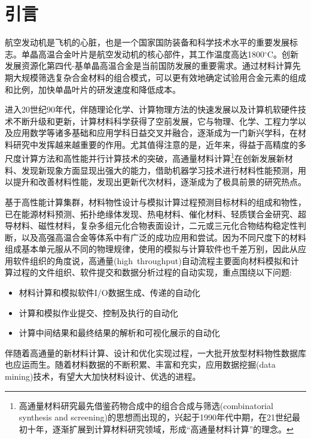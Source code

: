 \section{引言}
航空发动机是飞机的心脏，也是一个国家国防装备和科学技术水平的重要发展标志。单晶高温合金叶片是航空发动机的核心部件，其工作温度高达1800$^{\circ}\mathrm{C}$。创新发展资源化第四代-基单晶高温合金是当前国防发展的重要需求。通过材料计算先期大规模筛选复杂合金材料的组合模式，可以更有效地确定试验用合金元素的组成和比例，加快单晶叶片的研发速度和降低成本。

进入20世纪90年代，伴随理论化学、计算物理方法的快速发展以及计算机软硬件技术不断升级和更新，计算材料科学获得了空前发展，它与物理、化学、工程力学以及应用数学等诸多基础和应用学科日益交叉并融合，逐渐成为一门新兴学科，在材料研究中发挥越来越重要的作用。尤其值得注意的是，近年来，得益于高精度的多尺度计算方法和高性能并行计算技术的突破，高通量材料计算\footnote{高通量材料研究最先借鉴药物合成中的组合合成与筛选\textrm{(combinatorial synthesis and screening)}的思想而出现的，兴起于1990年代中期，在21世纪最初十年，逐渐扩展到计算材料研究领域，形成“高通量材料计算”的理念。}在创新发展新材料、发现新现象方面显现出强大的能力，借助机器学习技术进行材料性能预测，用以提升和改善材料性能，发现出更新代次材料，逐渐成为了极具前景的研究热点。

基于高性能计算集群，材料物性设计与模拟计算过程预测目标材料的组成和物性， 已在能源材料预测、拓扑绝缘体发现、热电材料、催化材料、轻质镁合金研究、超导材料、磁性材料，复杂多组元化合物表面设计，二元或三元化合物结构稳定性判断，以及高强高温合金等体系中有广泛的成功应用和尝试。因为不同尺度下的材料组成基本单元服从不同的物理规律，使用的模拟与计算软件也千差万别，因此从应用软件组织的角度说，高通量(\textrm{high~throughput})自动流程主要面向材料模拟和计算过程的文件组织、软件提交和数据分析过程的自动实现，重点围绕以下问题:~
\begin{itemize}
	\item 材料计算和模拟软件\textrm{I/O}数据生成、传递的自动化
	\item 计算和模拟作业提交、控制及执行的自动化
	\item 计算中间结果和最终结果的解析和可视化展示的自动化
\end{itemize}
伴随着高通量的新材料计算、设计和优化实现过程，一大批开放型材料物性数据库也应运而生。随着材料数据的不断积累、丰富和充实，应用数据挖掘(\textrm{data mining})技术，有望大大加快材料设计、优选的进程。

